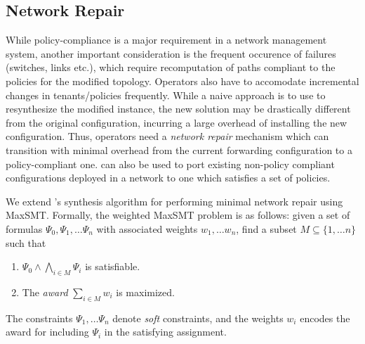 \subsection{Network Repair}
While policy-compliance is a major requirement in a network management system,
another important consideration is the frequent occurence of failures (switches, links etc.),
which require recomputation of paths compliant to the policies for the modified topology. Operators also have to accomodate incremental changes in tenants/policies frequently. 
While a naive approach is to use \name to resynthesize the modified instance,
the new solution may be drastically different from the original configuration, incurring a
large overhead of installing the new configuration. Thus, operators
need a \emph{network repair} mechanism which can transition with minimal
overhead from the current
forwarding configuration to a policy-compliant one. 
\name can also be used to
port existing non-policy compliant configurations deployed in a network to
one which satisfies a set of policies.

We extend \name's synthesis algorithm for performing
minimal network repair using MaxSMT.  
Formally, the weighted MaxSMT problem is as follows: given a set
of formulas $\Psi_0, \Psi_1, \ldots \Psi_n$ with associated 
weights $w_1, \ldots w_n$, find a subset $M \subseteq \{1, \ldots n\}$
such that 
\begin{enumerate}
	\item $\Psi_0 \wedge \bigwedge_{i \in M} \Psi_i$ is satisfiable.
	\item The \emph{award} $\sum_{i \in M} w_i$  is maximized.
\end{enumerate}
The constraints $\Psi_1, \ldots \Psi_n$ denote \emph{soft} constraints, and
the weights $w_i$ encodes the award for including $\Psi_i$ in the satisfying
assignment. 

